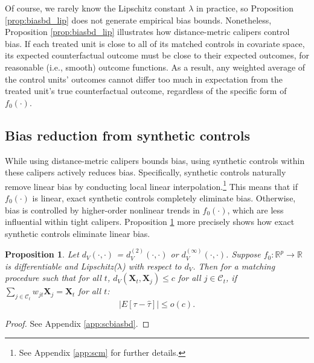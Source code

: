 \documentclass{article}
\newtheorem{proposition}[theorem]{Proposition}
\newcommand{\Xt}{\mathbf{X}_t}
\newcommand{\Xj}{\mathbf{X}_j}
\newcommand{\R}{\mathbb{R}}
\newcommand{\Rp}{\mathbb{R}^p}
\newcommand{\Ct}{\mathcal{C}_{t}}
\newcommand{\note}[1]{\textcolor{red}{\textit{#1}}}
\begin{document}
Of course, we rarely know the Lipschitz constant $\lambda$ in practice, so Proposition \ref{prop:biasbd_lip} does not generate empirical bias bounds.
Nonetheless, Proposition \ref{prop:biasbd_lip} illustrates how distance-metric calipers control bias.
If each treated unit is close to all of its matched controls in covariate space, its expected counterfactual outcome must be close to their expected outcomes, for reasonable (i.e., smooth) outcome functions.
As a result, any weighted average of the control units' outcomes cannot differ too much in expectation from the treated unit's true counterfactual outcome, regardless of the specific form of $f_0(\cdot)$.

\subsection{Bias reduction from synthetic controls}
\label{sec:biasbdscm}


While using distance-metric calipers bounds bias, using synthetic controls within these calipers actively reduces bias.
Specifically, synthetic controls naturally remove linear bias by conducting local linear interpolation.\footnote{See Appendix \ref{app:scm} for further details.}
This means that if $f_0(\cdot)$ is linear, exact synthetic controls completely eliminate bias.
Otherwise, bias is controlled by higher-order nonlinear trends in $f_0(\cdot)$, which are less influential within tight calipers.
Proposition \ref{prop:scbiasbd} more precisely shows how exact synthetic controls eliminate linear bias.
\begin{proposition}
\label{prop:scbiasbd}
Let $d_V(\cdot, \cdot)$ = $d^{(2)}_V(\cdot, \cdot)$ or $d^{(\infty)}_V(\cdot, \cdot)$.
Suppose $f_0: \Rp \to \R$ is differentiable and Lipschitz($\lambda$) with respect to $d_V$.
Then for a matching procedure such that for all $t$, $d_V(\Xt, \Xj) \leq c$ for all $j \in \Ct$,
if $\sum_{j \in \Ct} w_{jt} \Xj = \Xt$ for all $t$:
\begin{equation*}
    \big|E[\tau - \hat{\tau}] \big| \leq o(c).
\end{equation*}
\end{proposition}
\begin{proof}
    See Appendix \ref{app:scbiasbd}.
\end{proof}
\end{document}
